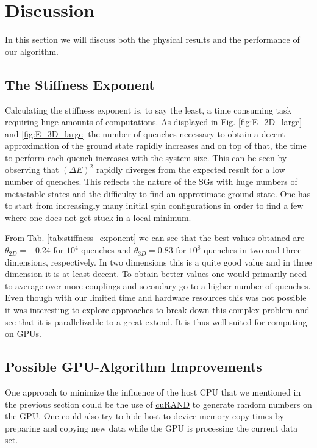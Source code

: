 \documentclass[paper=a4, fontsize=11pt]{scrartcl} %
\numberwithin{equation}{section} %
\numberwithin{figure}{section} %
\numberwithin{table}{section} %
\begin{document}
\section{Discussion}
\label{sec:discussion}
In this section we will discuss both the physical results and the performance of our algorithm.

\subsection{The Stiffness Exponent}
Calculating the stiffness exponent is, to say the least, a time consuming task requiring huge amounts of computations. As displayed in Fig. \ref{fig:E_2D_large} and \ref{fig:E_3D_large} the number of quenches necessary to obtain a decent approximation of the ground state rapidly increases and on top of that, the time to perform each quench increases with the system size. This can be seen by observing that $(\Delta E)^2$ rapidly diverges from the expected result for a low number of quenches. This reflects the nature of the SGs with huge numbers of metastable states and the difficulty to find an approximate ground state. One has to start from increasingly many initial spin configurations in order to find a few where one does not get stuck in a local minimum. 

From Tab. \ref{tab:stiffness_exponent} we can see that the best values obtained are $\theta_{2D}=-0.24$ for $10^4$ quenches and $\theta_{3D}=0.83$ for $10^8$ quenches in two and three dimensions, respectively. In two dimensions this is a quite good value and in three dimension it is at least decent. To obtain better values one would primarily need to average over more couplings and secondary go to a higher number of quenches. Even though with our limited time and hardware resources this was not possible it was interesting to explore approaches to break down this complex problem and see that it is parallelizable to a great extend. It is thus well suited for computing on GPUs.

\subsection{Possible GPU-Algorithm Improvements}
\label{sec:discussion_gpualgo}

One  approach to minimize the influence of the host CPU that we mentioned in the previous section could be the use of \href{http://docs.nvidia.com/cuda/curand/index.html}{cuRAND} to generate random numbers on the GPU. One could also try to hide host to device memory copy times by preparing and copying new data while the GPU is processing the current data set.
\end{document}
